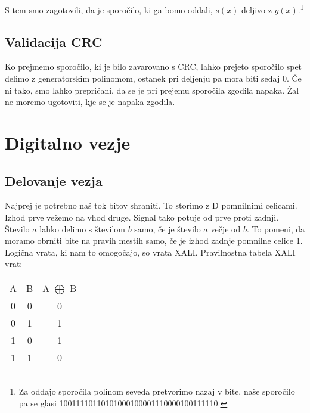 \documentclass[12pt]{article}
\begin{document}
        S tem smo zagotovili, da je sporočilo, ki ga bomo oddali, $s(x)$ deljivo
        z $g(x)$.\footnote{Za oddajo sporočila polinom seveda pretvorimo nazaj v
        bite, naše sporočilo pa se glasi 10011110110101000100001110000100111110.}

        \subsection{Validacija CRC}
        Ko prejmemo sporočilo, ki je bilo zavarovano s CRC, lahko prejeto
        sporočilo spet delimo z generatorskim polinomom, ostanek pri deljenju pa
        mora biti sedaj 0. Če ni tako, smo lahko prepričani, da se je pri prejemu
        sporočila zgodila napaka. Žal ne moremo ugotoviti, kje se je napaka
        zgodila.

\section{Digitalno vezje}
    \subsection{Delovanje vezja}
        Najprej je potrebno naš tok bitov shraniti. To storimo z D pomnilnimi
        celicami. Izhod prve vežemo na vhod druge. Signal tako potuje od prve
        proti zadnji. Število $a$ lahko delimo s številom $b$ samo, če je število
        $a$ večje od $b$. To pomeni, da moramo obrniti bite na pravih mestih
        samo, če je izhod zadnje pomnilne celice 1. Logična vrata, ki nam to
        omogočajo, so vrata XALI. Pravilnostna tabela XALI vrat:
        \begin{table}[!h]
            \centering
            \begin{tabular}{c|c||c}
                A & B & A $\bigoplus$ B\\
                \cline{1-3}
                0 & 0 & 0\\
                0 & 1 & 1\\
                1 & 0 & 1\\
                1 & 1 & 0\\
            \end{tabular}
        \end{table}
\end{document}

